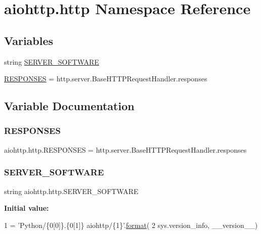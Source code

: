 \hypertarget{namespaceaiohttp_1_1http}{}\section{aiohttp.\+http Namespace Reference}
\label{namespaceaiohttp_1_1http}
\subsection*{Variables}
\begin{DoxyCompactItemize}
\item 
string \hyperlink{namespaceaiohttp_1_1http_a17bc62b17a475f0181dc6ddfb216d8eb}{S\+E\+R\+V\+E\+R\+\_\+\+S\+O\+F\+T\+W\+A\+RE}
\item 
\hyperlink{namespaceaiohttp_1_1http_a0ff4b4d5cddd6f8469633a6036ef678a}{R\+E\+S\+P\+O\+N\+S\+ES} = http.\+server.\+Base\+H\+T\+T\+P\+Request\+Handler.\+responses
\end{DoxyCompactItemize}


\subsection{Variable Documentation}
\mbox{\label{namespaceaiohttp_1_1http_a0ff4b4d5cddd6f8469633a6036ef678a}} 
\subsubsection{\texorpdfstring{R\+E\+S\+P\+O\+N\+S\+ES}{RESPONSES}}
{\footnotesize\ttfamily aiohttp.\+http.\+R\+E\+S\+P\+O\+N\+S\+ES = http.\+server.\+Base\+H\+T\+T\+P\+Request\+Handler.\+responses}

\mbox{\label{namespaceaiohttp_1_1http_a17bc62b17a475f0181dc6ddfb216d8eb}} 
\subsubsection{\texorpdfstring{S\+E\+R\+V\+E\+R\+\_\+\+S\+O\+F\+T\+W\+A\+RE}{SERVER\_SOFTWARE}}
{\footnotesize\ttfamily string aiohttp.\+http.\+S\+E\+R\+V\+E\+R\+\_\+\+S\+O\+F\+T\+W\+A\+RE}

{\bfseries Initial value\+:}
\begin{DoxyCode}
1 =  \textcolor{stringliteral}{'Python/\{0[0]\}.\{0[1]\} aiohttp/\{1\}'}.\hyperlink{namespaceserver_addb76dcb1b81da9cf62eb9849b07211a}{format}(
2     sys.version\_info, \_\_version\_\_)
\end{DoxyCode}
